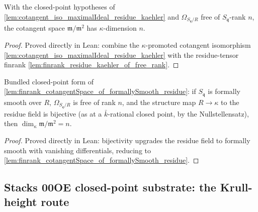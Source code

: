 \begin{lemma}
  \label{lem:finrank_cotangentSpace_of_formallySmooth_residue}
  With the closed-point hypotheses of
  \cref{lem:cotangent_iso_maximalIdeal_residue_kaehler} and
  \(\Omega_{S_{\mathfrak q}/R}\) free of \(S_{\mathfrak q}\)-rank \(n\), the cotangent
  space \(\mathfrak m / \mathfrak m^2\) has \(\kappa\)-dimension \(n\).
\end{lemma}

\begin{proof}
  Proved directly in Lean: combine the \(\kappa\)-promoted cotangent isomorphism
  \cref{lem:cotangent_iso_maximalIdeal_residue_kaehler} with the residue-tensor
  finrank \cref{lem:finrank_residue_kaehler_of_free_rank}.
\end{proof}

\begin{lemma}
  \label{lem:finrank_cotangentSpace_of_bijective_residue}
  Bundled closed-point form of
  \cref{lem:finrank_cotangentSpace_of_formallySmooth_residue}: if \(S_{\mathfrak q}\)
  is formally smooth over \(R\), \(\Omega_{S_{\mathfrak q}/R}\) is free of rank \(n\),
  and the structure map \(R \to \kappa\) to the residue field is bijective (as at a
  \(\bar k\)-rational closed point, by the Nullstellensatz), then
  \(\dim_\kappa \mathfrak m/\mathfrak m^2 = n\).
\end{lemma}

\begin{proof}
  Proved directly in Lean: bijectivity upgrades the residue field to formally smooth
  with vanishing differentials, reducing to
  \cref{lem:finrank_cotangentSpace_of_formallySmooth_residue}.
\end{proof}

\subsection{Stacks 00OE closed-point substrate: the Krull-height route}
\label{subsec:stage6_iib_substrate_iter200}

